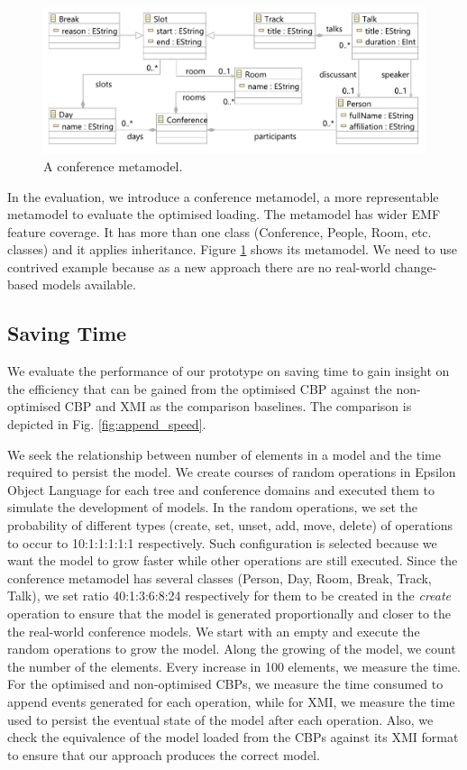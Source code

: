 \documentclass{llncs}
\begin{document}
\begin{figure}[htbp]
    \centering
    \includegraphics[width=0.9\linewidth]{conference_metamodel}
    \caption{A conference metamodel.}   
    \label{fig:node_metamodel}
\end{figure}

In the evaluation, we introduce a conference metamodel, a more representable metamodel to evaluate the optimised loading. The metamodel has wider EMF feature coverage. It has more than one class (Conference, People, Room, etc. classes) and it applies inheritance. Figure \ref{fig:node_metamodel} shows its metamodel. We need to use contrived example because as a new approach there are no real-world change-based models available. 

\subsection{Saving Time}
\label{subsec:saving_time_test}
We evaluate the performance of our prototype on saving time to gain insight on the efficiency that can be gained from the optimised CBP against the non-optimised CBP and XMI as the comparison baselines. The comparison is depicted in Fig. \ref{fig:append_speed}.

We seek the relationship between number of elements in a model and the time required to persist the model. We create courses of random operations in Epsilon Object Language \cite{kolovos2006epsilon} for each tree and conference domains and executed them to simulate the development of models. In the random operations, we set the probability of different types (create, set, unset, add, move, delete) of operations to occur to 10:1:1:1:1:1 respectively. Such configuration is selected because we want the model to grow faster while other operations are still executed. Since the conference metamodel has several classes (Person, Day, Room, Break, Track, Talk), we set ratio 40:1:3:6:8:24 respectively for them to be created in the \emph{create} operation to ensure that the model is generated proportionally and closer to the the real-world conference models. We start with an empty and execute the random operations to grow the model. Along the growing of the model, we count the number of the elements. Every increase in 100 elements, we measure the time. For  the optimised and non-optimised CBPs, we measure the time consumed to append events generated for each operation, while for XMI, we measure the time used to persist the eventual state of the model after each operation. Also, we check the equivalence of the model loaded from the CBPs against its XMI format to ensure that our approach produces the correct  model.
\end{document}

